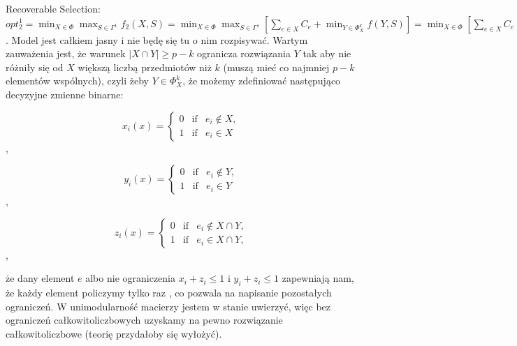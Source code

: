Recoverable Selection: $opt_{2}^{1} = \min_{X \in \Phi} \max_{S \in \Gamma^{1}} f_{2} \left( X, S \right) = \min_{X \in \Phi} \max_{S \in \Gamma^{1}} \left[ \sum_{e \in X} C_{e} + \min_{Y \in \Phi_{X}^{k}} f \left( Y, S \right) \right] = \min_{X \in \Phi} \left[ \sum_{e \in X} C_{e} + \min_{Y \in \Phi_{X}^{k}} \max_{S \in \Gamma^{1}} \sum_{e \in Y} c_{e}^{S} \right] = \min_{X \in \Phi} \left[ \sum_{e \in X} C_{e} + \min_{Y \in \Phi_{X}^{k}} \sum_{e \in Y} \overline{c}_{e}^{S} \right]$. Model jest całkiem jasny i nie będę się tu o nim rozpisywać. Wartym zauważenia jest, że warunek $\left| X \cap Y \right| \geqslant p - k$ ogranicza rozwiązania $Y$ tak aby nie różniły się od $X$ większą liczbą przedmiotów niż $k$ (muszą mieć co najmniej $p - k$ elementów wspólnych), czyli żeby $Y \in \Phi_{X}^{k}$, że możemy zdefiniować następująco decyzyjne zmienne binarne:

\begin{equation}
x_{i} \left( x \right) =
\left\{\begin{matrix}
0	&	\textrm{if}	&	e_{i} \notin X, \\ 
1	&	\textrm{if}	&	e_{i} \in X
\end{matrix}\right.
\end{equation},

\begin{equation}
y_{i} \left( x \right) =
\left\{\begin{matrix}
0	&	\textrm{if}	&	e_{i} \notin Y, \\ 
1	&	\textrm{if}	&	e_{i} \in Y
\end{matrix}\right.
\end{equation},

\begin{equation}
z_{i} \left( x \right) =
\left\{\begin{matrix}
0	&	\textrm{if}	&	e_{i} \notin X \cap Y, \\ 
1	&	\textrm{if}	&	e_{i} \in X \cap Y,
\end{matrix}\right.
\end{equation},

że dany element $e$ albo nie ograniczenia $x_{i} + z_{i} \leqslant 1$ i $y_{i} + z_{i} \leqslant 1$ zapewniają nam, że każdy element policzymy tylko raz , co pozwala na napisanie pozostałych ograniczeń.
W unimodularność macierzy jestem w stanie uwierzyć, więc bez ograniczeń całkowitoliczbowych uzyskamy na pewno rozwiązanie całkowitoliczbowe (teorię przydałoby się wyłożyć).

